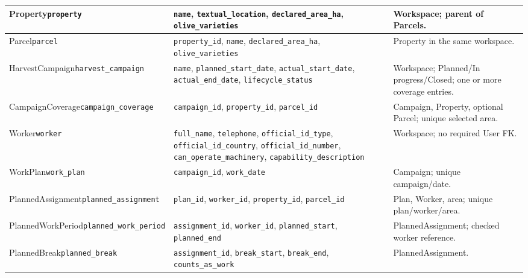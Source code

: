 {\begin{longtable}{L{0.27}L{0.4}L{0.33}}
\midrule
Property\newline \texttt{property} & \mbox{\texttt{name}}, \mbox{\texttt{textual\_location}}, \mbox{\texttt{declared\_area\_ha}}, \mbox{\texttt{olive\_varieties}} & Workspace; parent of Parcels. \\
\midrule
Parcel\newline \texttt{parcel} & \mbox{\texttt{property\_id}}, \mbox{\texttt{name}}, \mbox{\texttt{declared\_area\_ha}}, \mbox{\texttt{olive\_varieties}} & Property in the same workspace. \\
\midrule
HarvestCampaign\newline \texttt{harvest\_\allowbreak{}campaign} & \mbox{\texttt{name}}, \mbox{\texttt{planned\_start\_date}}, \mbox{\texttt{actual\_start\_date}}, \mbox{\texttt{actual\_end\_date}}, \mbox{\texttt{lifecycle\_status}} & Workspace; Planned/In progress/Closed; one or more coverage entries. \\
\midrule
CampaignCoverage\newline \texttt{campaign\_\allowbreak{}coverage} & \mbox{\texttt{campaign\_id}}, \mbox{\texttt{property\_id}}, \mbox{\texttt{parcel\_id}} & Campaign, Property, optional Parcel; unique selected area. \\
\midrule
Worker\newline \texttt{worker} & \mbox{\texttt{full\_name}}, \mbox{\texttt{telephone}}, \mbox{\texttt{official\_id\_type}}, \mbox{\texttt{official\_id\_country}}, \mbox{\texttt{official\_id\_number}}, \mbox{\texttt{can\_operate\_machinery}}, \mbox{\texttt{capability\_description}} & Workspace; no required User FK. \\
\midrule
WorkPlan\newline \texttt{work\_\allowbreak{}plan} & \mbox{\texttt{campaign\_id}}, \mbox{\texttt{work\_date}} & Campaign; unique campaign/date. \\
\midrule
PlannedAssignment\newline \texttt{planned\_\allowbreak{}assignment} & \mbox{\texttt{plan\_id}}, \mbox{\texttt{worker\_id}}, \mbox{\texttt{property\_id}}, \mbox{\texttt{parcel\_id}} & Plan, Worker, area; unique plan/worker/area. \\
\midrule
PlannedWorkPeriod\newline \texttt{planned\_\allowbreak{}work\_\allowbreak{}period} & \mbox{\texttt{assignment\_id}}, \mbox{\texttt{worker\_id}}, \mbox{\texttt{planned\_start}}, \mbox{\texttt{planned\_end}} & PlannedAssignment; checked worker reference. \\
\midrule
PlannedBreak\newline \texttt{planned\_\allowbreak{}break} & \mbox{\texttt{assignment\_id}}, \mbox{\texttt{break\_start}}, \mbox{\texttt{break\_end}}, \mbox{\texttt{counts\_as\_work}} & PlannedAssignment. \\

\end{longtable}}
